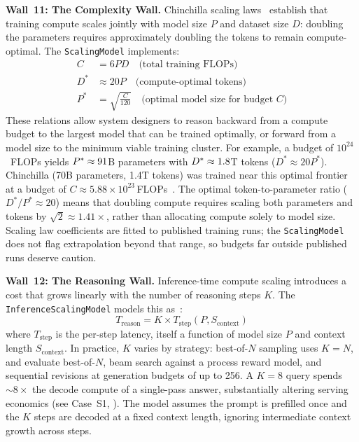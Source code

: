 \documentclass[10pt,twocolumn]{article}
\begin{document}
\textbf{Wall~11: The Complexity Wall.} Chinchilla scaling laws~\citep{hoffmann2022chinchilla} establish that training compute scales jointly with model size $P$ and dataset size $D$: doubling the parameters requires approximately doubling the tokens to remain compute-optimal. The \texttt{ScalingModel} implements:
\begin{align}
\label{eq:chinchilla}
C &= 6PD \quad \text{(total training FLOPs)} \\
D^{*} &\approx 20P \quad \text{(compute-optimal tokens)} \\
P^{*} &= \sqrt{\frac{C}{120}} \quad \text{(optimal model size for budget } C\text{)}
\end{align}
These relations allow system designers to reason backward from a compute budget to the largest model that can be trained optimally, or forward from a model size to the minimum viable training cluster. For example, a budget of $10^{24}$~FLOPs yields $P^{*} \approx 91$B parameters with $D^{*} \approx 1.8$T tokens ($D^* \approx 20P^*$). Chinchilla (70B parameters, 1.4T tokens) was trained near this optimal frontier at a budget of $C \approx 5.88 \times 10^{23}$\,FLOPs~\citep{hoffmann2022chinchilla}. The optimal token-to-parameter ratio ($D^*/P^* \approx 20$) means that doubling compute requires scaling both parameters and tokens by $\sqrt{2} \approx 1.41\times$, rather than allocating compute solely to model size. Scaling law coefficients are fitted to published training runs; the \texttt{ScalingModel} does not flag extrapolation beyond that range, so budgets far outside published runs deserve caution.

\textbf{Wall~12: The Reasoning Wall.} Inference-time compute scaling introduces a cost that grows linearly with the number of reasoning steps $K$. The \texttt{InferenceScalingModel} models this as~\citep{snell2025scaling}:
\begin{equation}
\label{eq:reasoning}
T_{\text{reason}} = K \times T_{\text{step}}(P, S_{\text{context}})
\end{equation}
where $T_{\text{step}}$ is the per-step latency, itself a function of model size $P$ and context length $S_{\text{context}}$. In practice, $K$ varies by strategy: best-of-$N$ sampling uses $K = N$, and \citet{snell2025scaling} evaluate best-of-$N$, beam search against a process reward model, and sequential revisions at generation budgets of up to 256. A $K{=}8$ query spends ${\sim}8{\times}$ the decode compute of a single-pass answer, substantially altering serving economics (see Case~S1, ). The model assumes the prompt is prefilled once and the $K$ steps are decoded at a fixed context length, ignoring intermediate context growth across steps.
\end{document}
